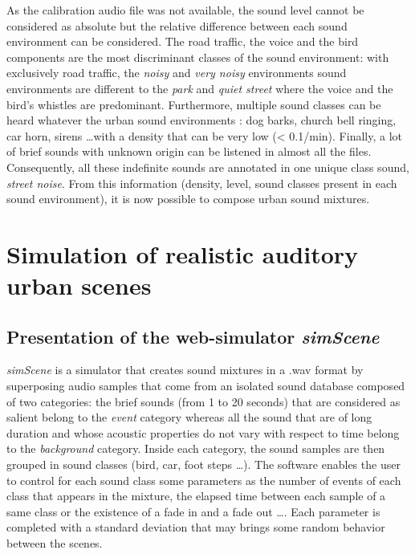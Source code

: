 \documentclass[11pt,letter]{article}
\begin{document}
As the calibration audio file was not available, the sound level cannot be considered as absolute but the relative difference between each sound environment can be considered. The road traffic, the voice and the bird components are the most discriminant classes of the sound environment: with exclusively road traffic, the \textit{noisy} and \textit{very noisy} environments sound environments are different to the \textit{park} and \textit{quiet street} where the voice and the bird's whistles are predominant. Furthermore, multiple sound classes can be heard whatever the urban sound environments : dog barks, church bell ringing, car horn, sirens \dots with a density that can be very low (< 0.1/min). Finally, a lot of brief sounds with unknown origin can be listened in almost all the files. Consequently, all these indefinite sounds are annotated in one unique class sound, \textit{street noise}. From this information (density, level, sound classes present in each sound environment), it is now possible to compose urban sound mixtures.

\section{Simulation of realistic auditory urban scenes} \label{sec:simulation}
\subsection{Presentation of the web-simulator \textit{simScene}}
\textit{simScene} \cite{rossignol_simscene:_2015} is a simulator that creates sound mixtures in a .wav format by superposing audio samples that come from an isolated sound database composed of two categories: the brief sounds (from 1 to 20 seconds) that are considered as salient belong to the \textit{event} category whereas all the sound that are of long duration and whose acoustic properties do not vary with respect to time belong to the \textit{background} category. Inside each category, the sound samples are then grouped in sound classes (bird, car, foot steps \dots). The software enables the user to control for each sound class some parameters as the number of events of each class that appears in the mixture, the elapsed time between each sample of a same class or the existence of a fade in and a fade out \dots. Each parameter is completed with a standard deviation that may brings some random behavior between the scenes. \\
\end{document}
